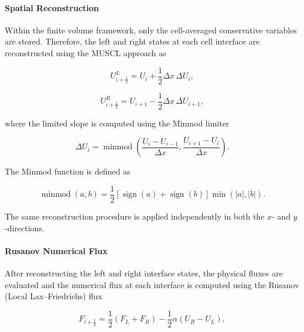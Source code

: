 \documentclass[12pt]{article}
\begin{document}
\paragraph{Spatial Reconstruction}

Within the finite volume framework, only the cell-averaged conservative variables are stored. Therefore, the left and right states at each cell interface are reconstructed using the MUSCL approach as

\begin{equation}
U_{i+\frac{1}{2}}^{L}
=
U_i
+
\frac{1}{2}
\Delta x
\,\Delta U_i,
\label{eq:MUSCL_left}
\end{equation}

\begin{equation}
U_{i+\frac{1}{2}}^{R}
=
U_{i+1}
-
\frac{1}{2}
\Delta x
\,\Delta U_{i+1},
\label{eq:MUSCL_right}
\end{equation}

where the limited slope is computed using the Minmod limiter

\begin{equation}
\Delta U_i
=
\operatorname{minmod}
\left(
\frac{U_i-U_{i-1}}{\Delta x},
\frac{U_{i+1}-U_i}{\Delta x}
\right).
\label{eq:slope}
\end{equation}

The Minmod function is defined as

\begin{equation}
\operatorname{minmod}(a,b)
=
\frac{1}{2}
\left[
\operatorname{sign}(a)
+
\operatorname{sign}(b)
\right]
\min
\left(
|a|,
|b|
\right).
\label{eq:minmod}
\end{equation}

The same reconstruction procedure is applied independently in both the $x$- and $y$-directions.

\paragraph{Rusanov Numerical Flux}

After reconstructing the left and right interface states, the physical fluxes are evaluated and the numerical flux at each interface is computed using the Rusanov (Local Lax--Friedrichs) flux

\begin{equation}
F_{i+\frac{1}{2}}
=
\frac{1}{2}
\left(
F_L+F_R
\right)
-
\frac{1}{2}
\alpha
\left(
U_R-U_L
\right),
\label{eq:rusanov}
\end{equation}
\end{document}
